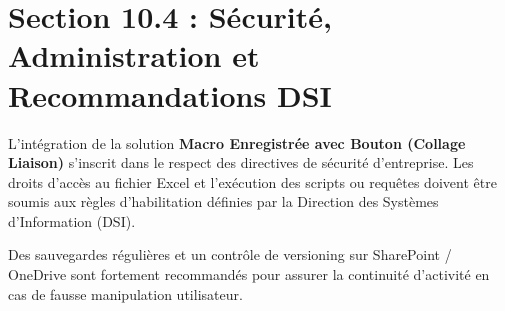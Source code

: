 \documentclass[12pt,a4paper]{report}
\begin{document}
\section{Section 10.4 : Sécurité, Administration et Recommandations DSI}
L'intégration de la solution \textbf{Macro Enregistrée avec Bouton (Collage Liaison)} s'inscrit dans le respect des directives de sécurité d'entreprise. Les droits d'accès au fichier Excel et l'exécution des scripts ou requêtes doivent être soumis aux règles d'habilitation définies par la Direction des Systèmes d'Information (DSI).

Des sauvegardes régulières et un contrôle de versioning sur SharePoint / OneDrive sont fortement recommandés pour assurer la continuité d'activité en cas de fausse manipulation utilisateur.
\end{document}

